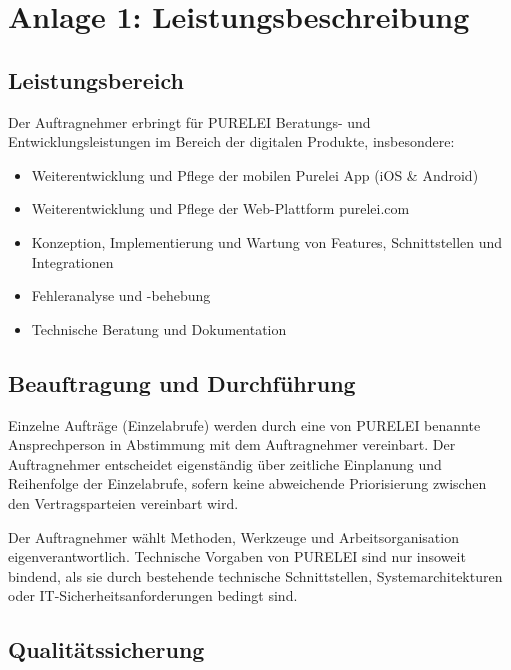 \documentclass[11pt,a4paper]{article}
\newcommand{\ClientKurzname}{PURELEI}
\begin{document}
\newpage
\section*{Anlage 1: Leistungsbeschreibung}

\subsection*{Leistungsbereich}

Der Auftragnehmer erbringt für \ClientKurzname{} Beratungs- und Entwicklungsleistungen im Bereich der digitalen Produkte, insbesondere:

\begin{itemize}[itemsep=1pt,topsep=2pt]
\item Weiterentwicklung und Pflege der mobilen Purelei App (iOS \& Android)
\item Weiterentwicklung und Pflege der Web-Plattform purelei.com
\item Konzeption, Implementierung und Wartung von Features, Schnittstellen und Integrationen
\item Fehleranalyse und -behebung
\item Technische Beratung und Dokumentation
\end{itemize}

\subsection*{Beauftragung und Durchführung}

Einzelne Aufträge (Einzelabrufe) werden durch eine von \ClientKurzname{} benannte Ansprechperson in Abstimmung mit dem Auftragnehmer vereinbart. Der Auftragnehmer entscheidet eigenständig über zeitliche Einplanung und Reihenfolge der Einzelabrufe, sofern keine abweichende Priorisierung zwischen den Vertragsparteien vereinbart wird.

Der Auftragnehmer wählt Methoden, Werkzeuge und Arbeitsorganisation eigenverantwortlich. Technische Vorgaben von \ClientKurzname{} sind nur insoweit bindend, als sie durch bestehende technische Schnittstellen, Systemarchitekturen oder IT-Sicherheitsanforderungen bedingt sind.

\subsection*{Qualitätssicherung}
\end{document}
